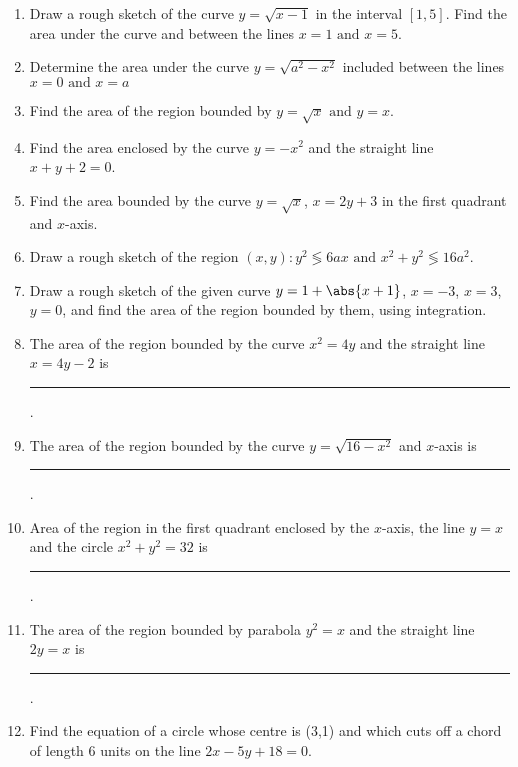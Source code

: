 \begin{enumerate}[label=\thesubsection.\arabic*,ref=\thesubsection.\theenumi]
\item Draw a rough sketch of the curve $y = \sqrt{x - 1}$ in the interval $[1, 5]$. Find the area under the curve and between the lines $x = 1\text{ and }x = 5$.
\item Determine the area under the curve $y = \sqrt{a^2 - x^2}$ included between the lines $x = 0\text{ and }x = a$
\item Find the area of the region bounded by $y = \sqrt{x}\text{ and }y = x$.
\item Find the area enclosed by the curve $y = - x^2$ and the straight line $x + y + 2 = 0$.
\item Find the area bounded by the curve $y = \sqrt{x}$, $x = 2y + 3$ in the first quadrant and $x$-axis.
\item Draw a rough sketch of the region ${(x, y) : y^2 \lessgtr 6ax\text{ and }x^2 + y^2 \lessgtr 16a^2}$.
\item Draw a  rough sketch of the given curve $y =1 + \abs{x + 1}$, $x = -3$, $x = 3$, $y = 0$, and find the area of the region bounded by them, using integration.
\item The area of the region bounded by the curve $x^2 = 4y$ and the straight line $x = 4y - 2$ is
	\rule{1cm}{0.1pt}.
\item The area of the region bounded by the curve $y = \sqrt{16 - x^2}$ and $x$-axis is 
	\rule{1cm}{0.1pt}.
\item Area of the region in the first quadrant enclosed by the $x$-axis, the line $y = x$ and the circle $x^2 + y^2 = 32$ is 
	\rule{1cm}{0.1pt}.
\item The area of the region bounded by parabola $y^2 = x$ and the straight line $2y = x$ is
	\rule{1cm}{0.1pt}.
\item Find the equation of a circle whose centre is (3,1) and which cuts off a chord of length  6 units on the  line $2x-5y+18=0$.
\end{enumerate}
